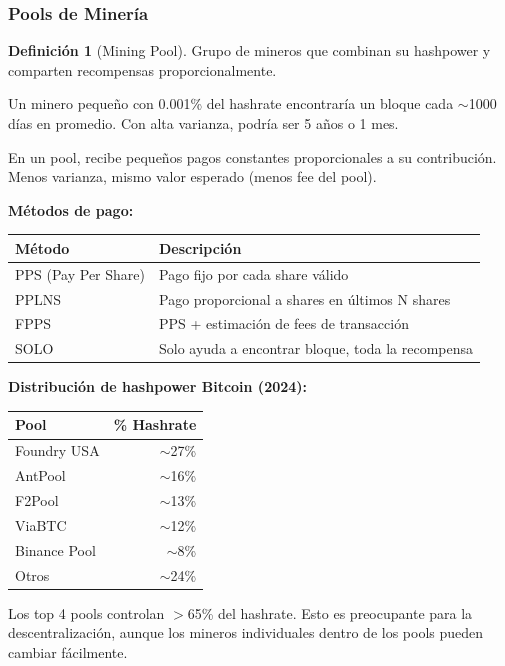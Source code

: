 \documentclass[11pt,a4paper,twoside,openright]{book}
\theoremstyle{definition}
\newtheorem{definition}{Definición}[chapter]
\theoremstyle{plain}
\theoremstyle{remark}
\begin{document}
\subsubsection{Pools de Minería}

\begin{definition}[Mining Pool]
Grupo de mineros que combinan su hashpower y comparten recompensas proporcionalmente.
\end{definition}

\begin{intuicion}
Un minero pequeño con 0.001\% del hashrate encontraría un bloque cada $\sim$1000 días en promedio. Con alta varianza, podría ser 5 años o 1 mes.

En un pool, recibe pequeños pagos constantes proporcionales a su contribución. Menos varianza, mismo valor esperado (menos fee del pool).
\end{intuicion}

\textbf{Métodos de pago:}

\begin{center}
\begin{tabular}{ll}
\toprule
\textbf{Método} & \textbf{Descripción} \\
\midrule
PPS (Pay Per Share) & Pago fijo por cada share válido \\
PPLNS & Pago proporcional a shares en últimos N shares \\
FPPS & PPS + estimación de fees de transacción \\
SOLO & Solo ayuda a encontrar bloque, toda la recompensa \\
\bottomrule
\end{tabular}
\end{center}

\begin{advertencia}
\textbf{Distribución de hashpower Bitcoin (2024):}

\begin{center}
\begin{tabular}{lr}
\toprule
\textbf{Pool} & \textbf{\% Hashrate} \\
\midrule
Foundry USA & $\sim$27\% \\
AntPool & $\sim$16\% \\
F2Pool & $\sim$13\% \\
ViaBTC & $\sim$12\% \\
Binance Pool & $\sim$8\% \\
Otros & $\sim$24\% \\
\bottomrule
\end{tabular}
\end{center}

Los top 4 pools controlan $>$65\% del hashrate. Esto es preocupante para la descentralización, aunque los mineros individuales dentro de los pools pueden cambiar fácilmente.
\end{advertencia}
\end{document}
